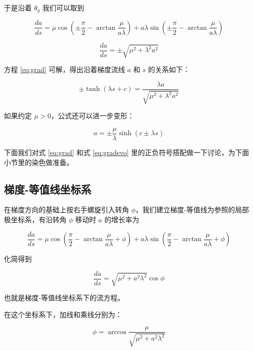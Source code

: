 \documentclass[a4paper,12pt]{article}
\numberwithin{definition}{section}
\numberwithin{lemma}{section}
\numberwithin{proposition}{section}
\numberwithin{theorem}{section}
\numberwithin{grammar}{section}
\numberwithin{program}{section}
\numberwithin{convention}{section}
\numberwithin{corollary}{section}
\begin{document}
于是沿着 $\theta_g$ 我们可以取到

\begin{equation}
    \frac{da}{ds} = \mu \cos (\pm \frac{\pi}{2} - \arctan \frac{\mu}{a \lambda}) + a \lambda \sin (\pm \frac{\pi}{2} - \arctan \frac{\mu}{a \lambda})
\end{equation}

\begin{equation}
    \frac{da}{ds} = \pm \sqrt{\mu^2 + \lambda^2 a^2}\label{eq:grad}
\end{equation}

方程 \eqref{eq:grad} 可解，得出沿着梯度流线 $a$ 和 $s$ 的关系如下：

\begin{equation}
    \pm \tanh(\lambda s + c) = \frac{\lambda a}{\sqrt{\mu^2 + \lambda^2 a^2}}
\end{equation}

如果约定 $\mu > 0$，公式还可以进一步变形：

\begin{equation}
  a = \pm \frac{\mu}{\lambda} \sinh(c \pm \lambda s)\label{eq:gradevo}
\end{equation}

下面我们对式 \ref{eq:grad} 和式 \ref{eq:gradevo} 里的正负符号搭配做一下讨论，为下面小节里的染色做准备。

\subsection{梯度-等值线坐标系}

在梯度方向的基础上按右手螺旋引入转角 $\phi$，我们建立梯度-等值线为参照的局部极坐标系，有沿转角 $\phi$ 移动时 $a$ 的增长率为

\begin{equation}
    \frac{da}{ds} = \mu \cos (\frac{\pi}{2} - \arctan \frac{\mu}{a \lambda} + \phi) + a \lambda \sin (\frac{\pi}{2} - \arctan \frac{\mu}{a \lambda} + \phi)
    \label{eq:fourfold}
\end{equation}

化简得到

\begin{equation}
    \frac{da}{ds} = \sqrt {\mu^2 + a^2 \lambda^2} \cos \phi\label{eq:contourgradient}
\end{equation}

也就是梯度-等值线坐标系下的流方程。

在这个坐标系下，加线和乘线分别为：

\begin{equation}
    \phi = \arccos \frac{\mu}{\sqrt {\mu^2 + a^2 \lambda^2}} \label{eq:additionalline}
\end{equation}
\end{document}
